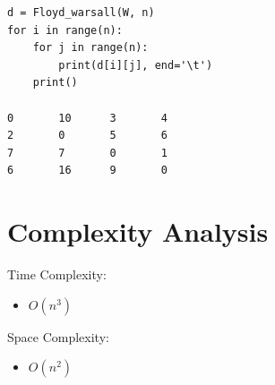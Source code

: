 \documentclass{article}
\begin{document}
{\begin{lstlisting}
d = Floyd_warsall(W, n)
for i in range(n):
    for j in range(n):
        print(d[i][j], end='\t')
    print()

0       10      3       4
2       0       5       6
7       7       0       1
6       16      9       0
\end{lstlisting}
\pagebreak
\section*{Complexity Analysis}
Time Complexity:
\begin{itemize}
    \item $O(n^3)$
\end{itemize}
Space Complexity:
\begin{itemize}
    \item $O(n^2)$
\end{itemize}
}
\end{document}
